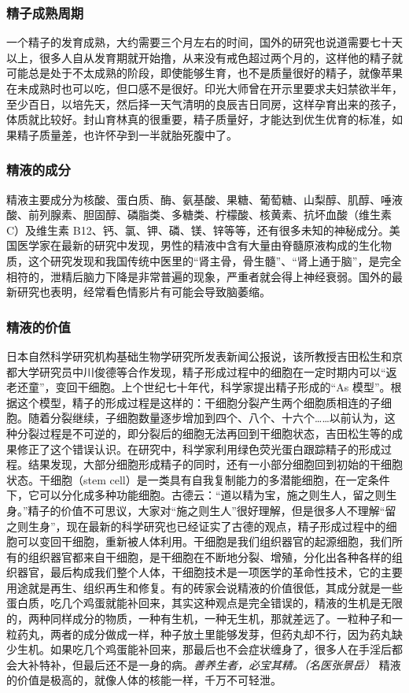 \subsubsection{精子成熟周期}

一个精子的发育成熟，大约需要三个月左右的时间，国外的研究也说道需要七十天以上，很多人自从发育期就开始撸，从来没有戒色超过两个月的，这样他的精子就可能总是处于不太成熟的阶段，即使能够生育，也不是质量很好的精子，就像苹果在未成熟时也可以吃，但口感不是很好。印光大师曾在开示里要求夫妇禁欲半年，至少百日，以培先天，然后择一天气清明的良辰吉日同房，这样孕育出来的孩子，体质就比较好。封山育林真的很重要，精子质量好，才能达到优生优育的标准，如果精子质量差，也许怀孕到一半就胎死腹中了。

\subsubsection{精液的成分}

精液主要成分为核酸、蛋白质、酶、氨基酸、果糖、葡萄糖、山梨醇、肌醇、唾液酸、前列腺素、胆固醇、磷脂类、多糖类、柠檬酸、核黄素、抗坏血酸（维生素 C）及维生素 B12、钙、氯、钾、磷、镁、锌等等，还有很多未知的神秘成分。美国医学家在最新的研究中发现，男性的精液中含有大量由脊髓原液构成的生化物质，这个研究发现和我国传统中医里的“肾主骨，骨生髓”、“肾上通于脑”，是完全相符的，泄精后脑力下降是非常普遍的现象，严重者就会得上神经衰弱。国外的最新研究也表明，经常看色情影片有可能会导致脑萎缩。

\subsubsection{精液的价值}

日本自然科学研究机构基础生物学研究所发表新闻公报说，该所教授吉田松生和京都大学研究员中川俊德等合作发现，精子形成过程中的细胞在一定时期内可以“返老还童”，变回干细胞。上个世纪七十年代，科学家提出精子形成的“As 模型”。根据这个模型，精子的形成过程是这样的：干细胞分裂产生两个细胞质相连的子细胞。随着分裂继续，子细胞数量逐步增加到四个、八个、十六个……以前认为，这种分裂过程是不可逆的，即分裂后的细胞无法再回到干细胞状态，吉田松生等的成果修正了这个错误认识。在研究中，科学家利用绿色荧光蛋白跟踪精子的形成过程。结果发现，大部分细胞形成精子的同时，还有一小部分细胞回到初始的干细胞状态。干细胞（stem cell）是一类具有自我复制能力的多潜能细胞，在一定条件下，它可以分化成多种功能细胞。古德云：“道以精为宝，施之则生人，留之则生身。”精子的价值不可思议，大家对“施之则生人”很好理解，但是很多人不理解“留之则生身”，现在最新的科学研究也已经证实了古德的观点，精子形成过程中的细胞可以变回干细胞，重新被人体利用。干细胞是我们组织器官的起源细胞，我们所有的组织器官都来自干细胞，是干细胞在不断地分裂、增殖，分化出各种各样的组织器官，最后构成我们整个人体，干细胞技术是一项医学的革命性技术，它的主要用途就是再生、组织再生和修复。有的砖家会说精液的价值很低，其成分就是一些蛋白质，吃几个鸡蛋就能补回来，其实这种观点是完全错误的，精液的生机是无限的，两种同样成分的物质，一种有生机，一种无生机，那就差远了。一粒种子和一粒药丸，两者的成分做成一样，种子放土里能够发芽，但药丸却不行，因为药丸缺少生机。如果吃几个鸡蛋能补回来，那最后也不会症状缠身了，很多人在手淫后都会大补特补，但最后还不是一身的病。\textit{善养生者，必宝其精。（名医张景岳）} 精液的价值是极高的，就像人体的核能一样，千万不可轻泄。


